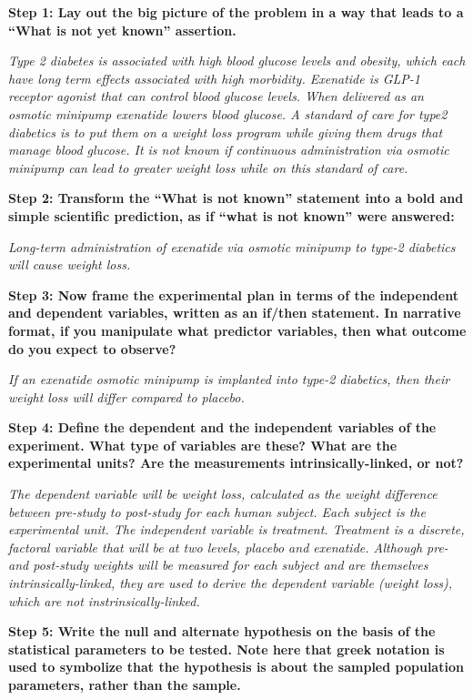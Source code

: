 \documentclass[]{book}
\begin{document}
\textbf{Step 1: Lay out the big picture of the problem in a way that leads to a ``What is not yet known'' assertion.}

\emph{Type 2 diabetes is associated with high blood glucose levels and obesity, which each have long term effects associated with high morbidity. Exenatide is GLP-1 receptor agonist that can control blood glucose levels. When delivered as an osmotic minipump exenatide lowers blood glucose. A standard of care for type2 diabetics is to put them on a weight loss program while giving them drugs that manage blood glucose. It is not known if continuous administration via osmotic minipump can lead to greater weight loss while on this standard of care.}

\textbf{Step 2: Transform the ``What is not known'' statement into a bold and simple scientific prediction, as if ``what is not known'' were answered:}

\emph{Long-term administration of exenatide via osmotic minipump to type-2 diabetics will cause weight loss.}

\textbf{Step 3: Now frame the experimental plan in terms of the independent and dependent variables, written as an if/then statement. In narrative format, if you manipulate what predictor variables, then what outcome do you expect to observe?}

\emph{If an exenatide osmotic minipump is implanted into type-2 diabetics, then their weight loss will differ compared to placebo.}

\textbf{Step 4: Define the dependent and the independent variables of the experiment. What type of variables are these? What are the experimental units? Are the measurements intrinsically-linked, or not?}

\emph{The dependent variable will be weight loss, calculated as the weight difference between pre-study to post-study for each human subject. Each subject is the experimental unit. The independent variable is treatment. Treatment is a discrete, factoral variable that will be at two levels, placebo and exenatide. Although pre- and post-study weights will be measured for each subject and are themselves intrinsically-linked, they are used to derive the dependent variable (weight loss), which are not instrinsically-linked.}

\textbf{Step 5: Write the null and alternate hypothesis on the basis of the statistical parameters to be tested. Note here that greek notation is used to symbolize that the hypothesis is about the sampled population parameters, rather than the sample.}
\end{document}
